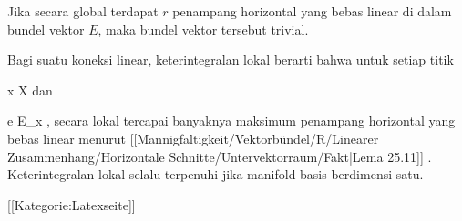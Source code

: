 Jika secara global
 {} {}
terdapat $r$ penampang horizontal yang bebas linear di dalam bundel vektor $E$, maka bundel vektor tersebut trivial.

Bagi suatu koneksi linear, keterintegralan lokal berarti bahwa untuk setiap titik

\mavergleichskette
{\vergleichskette
{ x
}
{ \in }{ X
}
{  }{
}
{    }{
}
{   }{
}
}
{}{}{}
dan

\mavergleichskette
{\vergleichskette
{ e
}
{ \in }{ E_x
}
{  }{
}
{    }{
}
{   }{
}
}
{}{}{,}
secara lokal
 {} {}
tercapai banyaknya maksimum penampang horizontal yang bebas linear menurut
[[Mannigfaltigkeit/Vektorbündel/R/Linearer Zusammenhang/Horizontale Schnitte/Untervektorraum/Fakt|Lema 25.11]]
 {} {.}
Keterintegralan lokal selalu terpenuhi jika manifold basis berdimensi satu.

 [[Kategorie:Latexseite]]
